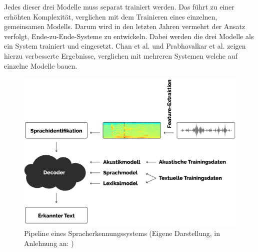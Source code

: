 Jedes dieser drei Modelle muss separat trainiert werden. Das führt zu einer erhöhten Komplexität, verglichen mit dem Trainieren eines einzelnen, gemeinsamen Modells.
Darum wird in den letzten Jahren vermehrt der Ansatz verfolgt, Ende-zu-Ende-Systeme zu entwickeln. Dabei werden die drei Modelle als ein System trainiert und eingesetzt.
Chan et al. \cite{Chan.2015} und Prabhavalkar et al. \cite{Prabhavalkar.2017} zeigen hierzu verbesserte Ergebnisse, verglichen mit mehreren Systemen welche auf einzelne Modelle bauen.

\begin{figure}[h!]
    \centering
    \includegraphics[width=1\linewidth]{images/pipeline}
    \caption{Pipeline eines Spracherkennungssystems (Eigene Darstellung, in Anlehnung an: \cite{Tom.2016}) }%
    \label{fig:pipeline}
\end{figure}